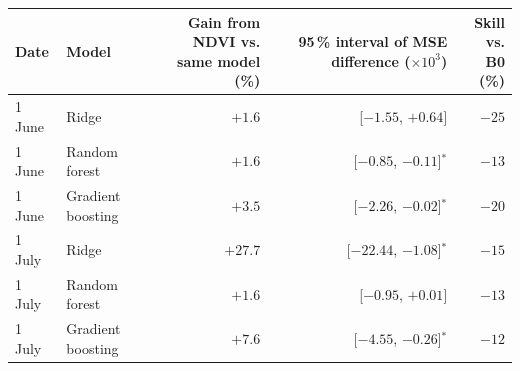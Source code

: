 \begin{tabular}{llrrr}
\toprule
Date & Model & \shortstack{Gain from NDVI vs.\\same model (\%)} & \shortstack{95\,\% interval of MSE\\difference ($\times 10^3$)} & \shortstack{Skill vs.\\B0 (\%)} \\
\midrule
1 June & Ridge & $+1.6$ & [$-1.55$, $+0.64$] & $-25$ \\
1 June & Random forest & $+1.6$ & [$-0.85$, $-0.11$]$^*$ & $-13$ \\
1 June & Gradient boosting & $+3.5$ & [$-2.26$, $-0.02$]$^*$ & $-20$ \\
1 July & Ridge & $+27.7$ & [$-22.44$, $-1.08$]$^*$ & $-15$ \\
1 July & Random forest & $+1.6$ & [$-0.95$, $+0.01$] & $-13$ \\
1 July & Gradient boosting & $+7.6$ & [$-4.55$, $-0.26$]$^*$ & $-12$ \\
\bottomrule
\end{tabular}
